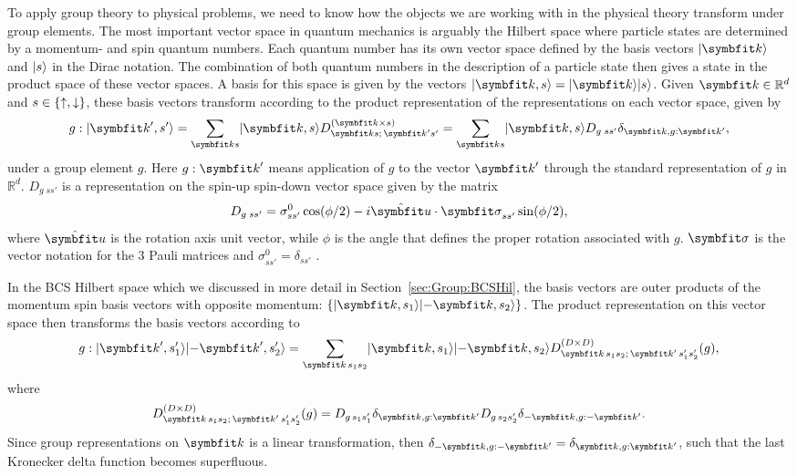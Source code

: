 To apply group theory to physical problems, we need to know how the objects we are working with in the physical theory transform under group elements.
The most important vector space in quantum mechanics is arguably the Hilbert space where particle states are determined by a momentum- and spin
quantum numbers. Each quantum number has its own vector space defined by the basis vectors $\ket{\v{k}}$ and $\lvert s \rangle$ in the Dirac notation. The
combination of both quantum numbers in the description of a particle state then gives a state in the product space of these vector spaces.
A basis for this space is given by the vectors $\ket{\v{k},s} = \ket{\v{k}}\ket{s}$. Given $\v{k}\in\mathbb{R}^d$ and $s\in\{\uparrow,\downarrow\}$,
these basis vectors transform according to the product representation of the representations on each vector space, given by
\begin{equation}
    \label{eq:Group:App}
    g : \ket{\v{k}',s'} = \sum_{\v{k}s}\ket{\v{k},s}D^{(\v{k}\times s)}_{\v{k}s;\,\v{k}'s'} = \sum_{\v{k}s}\ket{\v{k},s}D_{g\;ss'}\delta_{\v{k},g:\v{k}'},
\end{equation}
under a group element $g$. Here $g:\v{k}'$ means application of $g$ to the vector $\v{k}'$ through the standard representation of $g$ in $\mathbb{R}^d$.
$D_{g\;ss'}$ is a representation on the spin-up spin-down vector space given by the matrix
\begin{equation}
    \label{eq:Group:Prod:spinRepMatrix}
    D_{g\;ss'} = \sigma^0_{ss'}\cos(\phi/2) - i\hat{\v{u}}\cdot\v{\sigma}_{ss'}\sin(\phi/2),
\end{equation}
where $\hat{\v{u}}$ is the rotation axis unit vector, while $\phi$ is the angle that defines the proper rotation associated with $g$. $\v{\sigma}$ is
the vector notation for the $3$ Pauli matrices and $\sigma^0_{ss'}=\delta_{ss'}$ \cite{Sergi04,Merzbacher99}.

In the BCS Hilbert space which we discussed in more detail in Section~\ref{sec:Group:BCSHil},
the basis vectors are outer products of the momentum spin basis vectors with opposite momentum: $\{\ket{\v{k},s_1}\ket{-\v{k},s_2}\}$. The product
representation on this vector space then transforms the basis vectors according to
\begin{equation}
    \label{eq:Group:Prod:BCSProdRep}
    g:\ket{\v{k}',s_1'}\ket{-\v{k}',s_2'} = \sum_{\v{k}\,s_1s_2}\ket{\v{k},s_1}\ket{-\v{k},s_2}D^{(D\times D)}_{\v{k}\,s_1s_2;\,\v{k}'\,s_1's_2'}(g),
\end{equation}
where
\begin{equation}
    \label{eq:Group:Prod:BCSProdMatrix}
    D^{(D\times D)}_{\v{k}\,s_1s_2;\,\v{k}'\,s_1's_2'}(g) = D_{g\,s_1s_1'}\delta_{\v{k},g:\v{k}'}D_{g\,s_2s_2'}\delta_{-\v{k},g:-\v{k}'}.
\end{equation}
Since group representations on $\v{k}$ is a linear transformation, then $\delta_{-\v{k},g:-\v{k}'} = \delta_{\v{k},g:\v{k}'}$, such that the last
Kronecker delta function becomes superfluous.

